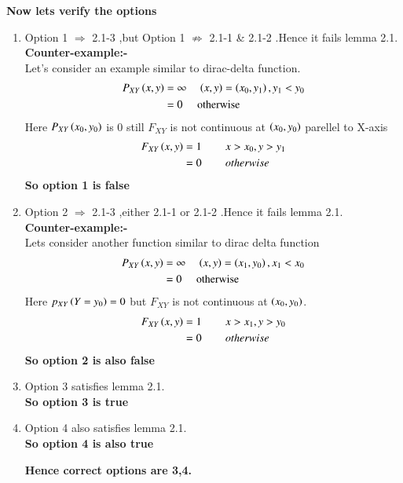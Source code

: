 \documentclass[journal,12pt,twocolumn]{IEEEtran}
\begin{document}
\textbf{Now lets verify the options}
\begin{enumerate}
\item Option 1 $\Rightarrow$ 2.1-3 ,but Option 1 $\not \Rightarrow$ 2.1-1 \& 2.1-2 .Hence it fails lemma 2.1.\\
\textbf{Counter-example:-}\\
Let's consider an example similar to dirac-delta function.
\begin{align}
P_{XY}\left(x,y\right)&=\infty \hspace{0.15in} \left(x,y\right)=\left(x_0,y_1\right) , y_1<y_0  \nonumber \\
&=0 \hspace{0.15in} \text{ otherwise}
\end{align}
Here $P_{XY}\left(x_0,y_0\right)$ is 0 still $F_{XY}$ is not continuous at $\left(x_0,y_0\right)$ parellel to X-axis
\begin{align}
F_{XY}\left(x,y\right)&=1 \hspace{0.3in} x>x_0,y>y_1 \nonumber\\
&=0 \hspace{0.3in} otherwise
\end{align}
\textbf{So option 1 is false}
\item Option 2 $\Rightarrow$ 2.1-3 ,either 2.1-1 or 2.1-2 .Hence it fails lemma 2.1.\\
\textbf{Counter-example:-}\\
Lets consider another function similar to dirac delta function
\begin{align}
P_{XY}\left(x,y\right)&=\infty \hspace{0.15in} \left(x,y\right)=\left(x_1,y_0\right) , x_1<x_0  \nonumber \\
&=0 \hspace{0.15in} \text{ otherwise}
\end{align}
Here $p_{XY}\left(Y=y_0\right)=0$ but $F_{XY}$ is not continuous at $\left(x_0,y_0\right)$.
\begin{align}
F_{XY}\left(x,y\right)&=1 \hspace{0.3in} x>x_1,y>y_0 \nonumber\\
&=0 \hspace{0.3in} otherwise
\end{align}
\textbf{So option 2 is also false}
\item Option 3 satisfies lemma 2.1.\\
\textbf{So option 3 is true}
\item Option 4 also satisfies lemma 2.1.\\
\textbf{So option 4 is also true}
\begin{center}
\textbf{Hence correct options are 3,4.}
\end{center}
\end{enumerate}
\end{document}
